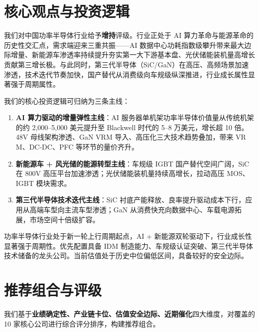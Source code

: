 
\section{核心观点与投资逻辑}

我们对中国功率半导体行业给予\textbf{增持}评级。行业正处于 AI 算力革命与能源革命的历史性交汇点，需求端迎来三重共振——AI 数据中心功耗指数级攀升带来最大边际增量、新能源车渗透率持续提升夯实第一大下游基本盘、光伏储能装机量高增长贡献第三增长极。与此同时，第三代半导体（SiC/GaN）在高压、高频场景加速渗透，技术迭代节奏加快，国产替代从消费级向车规级纵深推进，行业成长属性显著强于周期属性。

\vspace{0.3em}

我们的核心投资逻辑可归纳为三条主线：

\begin{enumerate}[leftmargin=2em]
\item \textbf{AI 算力驱动的增量弹性主线}：AI 服务器单机架功率半导体价值量从传统机架的约 2,000–5,000 美元提升至 Blackwell 时代的 5–8 万美元，增长超 10 倍。48V 母线架构渗透、GaN VRM 导入、高压化三大技术趋势叠加，带来 VR M、DC-DC、PFC 等环节的量价齐升。
\item \textbf{新能源车 + 风光储的能源转型主线}：车规级 IGBT 国产替代空间广阔，SiC 在 800V 高压平台加速渗透；光伏储能装机量持续高增长，拉动高压 MOS、IGBT 模块需求。
\item \textbf{第三代半导体技术迭代主线}：SiC 衬底产能释放、良率提升驱动成本下行，应用从高端车型向主流车型渗透；GaN 从消费快充向数据中心、车载电源拓展，市场空间十倍级扩容。
\end{enumerate}

\vspace{0.3em}

\begin{keyinsight}[投资核心结论]
功率半导体行业处于新一轮上行周期起点，AI + 新能源双轮驱动下，行业成长性显著强于周期性。优先配置具备 IDM 制造能力、车规级认证突破、第三代半导体技术储备的龙头公司。当前估值处于历史中位偏低区间，具备较好的安全边际。
\end{keyinsight}

\section{推荐组合与评级}

我们基于\textbf{业绩确定性、产业链卡位、估值安全边际、近期催化}四大维度，对覆盖的 10 家核心公司进行综合评分排序，构建推荐组合。

